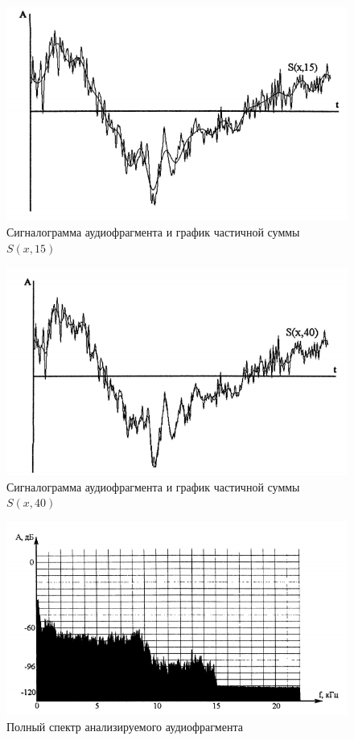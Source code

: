 \documentclass[oneside, final, 14pt]{extreport}
\begin{document}
\begin{figure}
\centering
\includegraphics{pic-specter-07}
\caption{Сигналограмма аудиофрагмента и график частичной суммы \(S(x,15)\)}
\label{pic-specter-07}
\end{figure}

\begin{figure}
\centering
\includegraphics{pic-specter-08}
\caption{Сигналограмма аудиофрагмента и график частичной суммы \(S(x,40)\)}
\label{pic-specter-08}
\end{figure}

\begin{figure}
\centering
\includegraphics{pic-specter-09}
\caption{Полный спектр анализируемого аудиофрагмента}
\label{pic-specter-09}
\end{figure}
\end{document}
